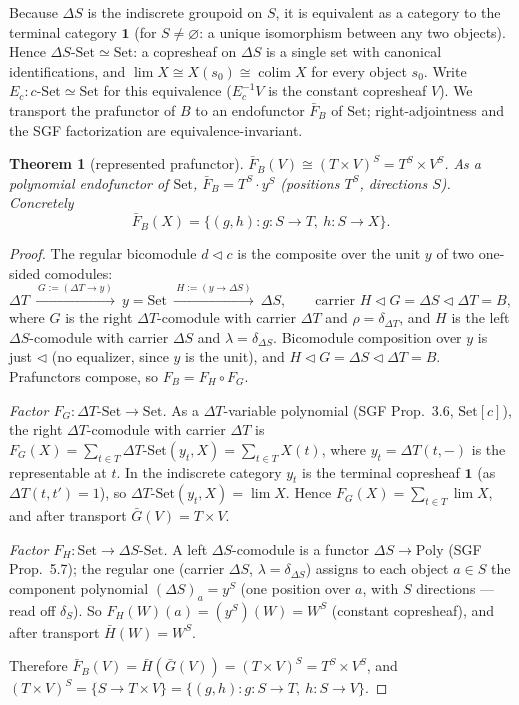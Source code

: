 \documentclass[11pt]{article}
\newtheorem{theorem}{Theorem}
\theoremstyle{definition}
\newcommand{\Set}{\mathrm{Set}}
\newcommand{\Poly}{\mathrm{Poly}}
\newcommand{\comp}{\triangleleft}
\DeclareMathOperator{\colim}{colim}
\begin{document}
Because $\Delta S$ is the indiscrete groupoid on $S$, it is equivalent as a category to the
terminal category $\mathbf 1$ (for $S\neq\varnothing$: a unique isomorphism between any two
objects). Hence $\Delta S\text{-}\Set\simeq\Set$: a copresheaf on $\Delta S$ is a single set
with canonical identifications, and $\lim X\cong X(s_{0})\cong\colim X$ for every object
$s_{0}$. Write $E_{c}\colon c\text{-}\Set\simeq\Set$ for this equivalence ($E_{c}^{-1}V$ is
the constant copresheaf $V$). We transport the prafunctor of $B$ to an endofunctor
$\bar F_{B}$ of $\Set$; right-adjointness and the SGF factorization are
equivalence-invariant.

\begin{theorem}[represented prafunctor]\label{thm:represented}
$\bar F_{B}(V)\cong(T\times V)^{S}=T^{S}\times V^{S}$. As a polynomial endofunctor of
$\Set$, $\bar F_{B}=T^{S}\cdot y^{S}$ (positions $T^{S}$, directions $S$). Concretely
\[
\bar F_{B}(X)=\{(g,h)\colon g\colon S\to T,\ h\colon S\to X\}.
\]
\end{theorem}

\begin{proof}
The regular bicomodule $d\comp c$ is the composite over the unit $y$ of two one-sided
comodules:
\[
\Delta T\ \xrightarrow{\ G:=(\Delta T\to y)\ }\ y=\Set\ \xrightarrow{\ H:=(y\to\Delta S)\ }\ \Delta S,
\qquad\text{carrier } H\comp G=\Delta S\comp\Delta T=B,
\]
where $G$ is the right $\Delta T$-comodule with carrier $\Delta T$ and
$\rho=\delta_{\Delta T}$, and $H$ is the left $\Delta S$-comodule with carrier $\Delta S$ and
$\lambda=\delta_{\Delta S}$. Bicomodule composition over $y$ is just $\comp$ (no equalizer,
since $y$ is the unit), and $H\comp G=\Delta S\comp\Delta T=B$. Prafunctors compose, so
$F_{B}=F_{H}\circ F_{G}$.

\emph{Factor $F_{G}\colon\Delta T\text{-}\Set\to\Set$.} As a $\Delta T$-variable polynomial
(SGF Prop.~3.6, $\Set[c]$), the right $\Delta T$-comodule with carrier $\Delta T$ is
$F_{G}(X)=\sum_{t\in T}\Delta T\text{-}\Set(y_{t},X)=\sum_{t\in T}X(t)$, where
$y_{t}=\Delta T(t,-)$ is the representable at $t$. In the indiscrete category $y_{t}$ is the
terminal copresheaf $\mathbf 1$ (as $\Delta T(t,t')=1$), so $\Delta T\text{-}\Set(y_{t},X)=\lim X$.
Hence $F_{G}(X)=\sum_{t\in T}\lim X$, and after transport $\bar G(V)=T\times V$.

\emph{Factor $F_{H}\colon\Set\to\Delta S\text{-}\Set$.} A left $\Delta S$-comodule is a functor
$\Delta S\to\Poly$ (SGF Prop.~5.7); the regular one (carrier $\Delta S$,
$\lambda=\delta_{\Delta S}$) assigns to each object $a\in S$ the component polynomial
$(\Delta S)_{a}=y^{S}$ (one position over $a$, with $S$ directions --- read off
$\delta_{S}$). So $F_{H}(W)(a)=(y^{S})(W)=W^{S}$ (constant copresheaf), and after transport
$\bar H(W)=W^{S}$.

Therefore $\bar F_{B}(V)=\bar H(\bar G(V))=(T\times V)^{S}=T^{S}\times V^{S}$, and
$(T\times V)^{S}=\{S\to T\times V\}=\{(g,h)\colon g\colon S\to T,\ h\colon S\to V\}$.
\end{proof}
\end{document}
